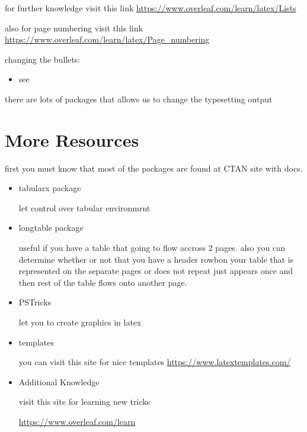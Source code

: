 \documentclass{article} %
\begin{document}
    \noindent for further knowledge visit this link \url{https://www.overleaf.com/learn/latex/Lists} 
    
    \noindent also for page numbering visit this link \url{https://www.overleaf.com/learn/latex/Page_numbering}

    \hfill

    \noindent changing the bullets:
    
    \renewcommand{\labelitemi}{$\rightarrow$}
    \begin{itemize}
        \item see
    \end{itemize}
    
    there are lots of packages that allows us to change the typesetting output
    
\section{More Resources}   

    first you must know that most of the packages are found at CTAN site with docs.

    \renewcommand{\labelitemi}{$\bullet$}
    \begin{itemize}
        \item tabularx package
        
            \qquad let control over tabular environmrnt
        
        \item longtable package
        
            \qquad useful if you have a table that going to flow accross 2 pages. also you can determine whether or not that you have a header rowbon your table that is represented on the separate pages or does not repeat just appears once and then rest of the table flows onto another page.
        
        \item PSTricks
        
            \qquad let you to create graphics in latex
            
        \item templates
        
            \qquad you can visit this site for nice templates \url{https://www.latextemplates.com/}
            
        \item Additional Knowledge
        
            \qquad visit this site for learning new tricks
            
            \qquad \url{https://www.overleaf.com/learn}
        
    \end{itemize}
    
\end{document}
